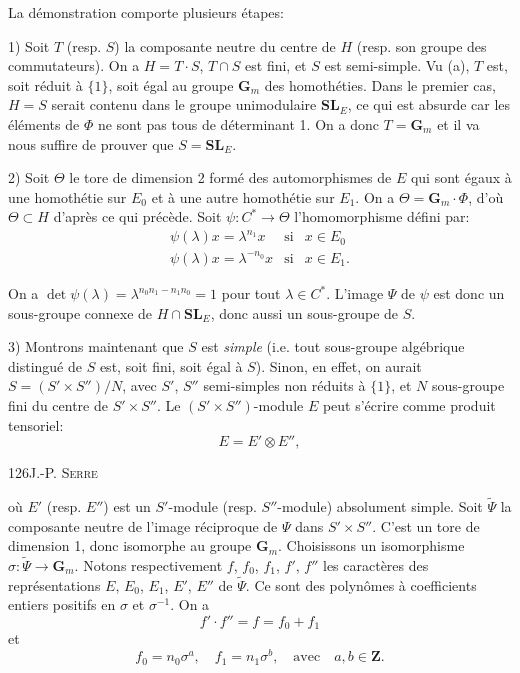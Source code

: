 La démonstration comporte plusieurs étapes:

1) Soit $T$ (resp. $S$) la composante neutre du centre de $H$ (resp. son groupe des commutateurs). On a $H=T\cdot S$, $T\cap S$ est fini, et $S$ est semi-simple. Vu (a), $T$ est, soit réduit à $\{1\}$, soit égal au groupe $\mathbf G_m$ des homothéties. Dans le premier cas, $H=S$ serait contenu dans le groupe unimodulaire $\mathbf{SL}_E$, ce qui est absurde car les éléments de $\Phi$ ne sont pas tous de déterminant 1. On a donc $T=\mathbf G_m$ et il va nous suffire de prouver que $S=\mathbf{SL}_E$.

2) Soit $\Theta$ le tore de dimension 2 formé des automorphismes de $E$ qui sont égaux à une homothétie sur $E_0$ et à une autre homothétie sur $E_1$. On a $\Theta=\mathbf G_m\cdot\Phi$, d'où $\Theta\subset H$ d'après ce qui précède. Soit $\psi:C^*\to\Theta$ l'homomorphisme défini par:
\[
\begin{array}{lll}
\psi(\lambda)x=\lambda^{n_1}x&\text{si}&x\in E_0\\
\psi(\lambda)x=\lambda^{-n_0}x&\text{si}&x\in E_1.
\end{array}
\]

On a $\det\psi(\lambda)=\lambda^{n_0n_1-n_1n_0}=1$ pour tout $\lambda\in C^*$. L'image $\Psi$ de $\psi$ est donc un sous-groupe connexe de $H\cap\mathbf{SL}_E$, donc aussi un sous-groupe de $S$.

3) Montrons maintenant que $S$ est \textit{simple} (i.e. tout sous-groupe algébrique distingué de $S$ est, soit fini, soit égal à $S$). Sinon, en effet, on aurait $S=(S'\times S'')/N$, avec $S'$, $S''$ semi-simples non réduits à $\{1\}$, et $N$ sous-groupe fini du centre de $S'\times S''$. Le $(S'\times S'')$-module $E$ peut s'écrire comme produit tensoriel:
\[
E=E'\otimes E'',
\]

126\hfill J.-P. \textsc{Serre}

 où $E'$ (resp. $E''$) est un $S'$-module (resp. $S''$-module) absolument simple. Soit $\widetilde\Psi$ la composante neutre de l'image réciproque de $\Psi$ dans $S'\times S''$. C'est un tore de dimension 1, donc isomorphe au groupe $\mathbf G_m$. Choisissons un isomorphisme $\sigma:\widetilde\Psi\to\mathbf G_m$. Notons respectivement $f$, $f_0$, $f_1$, $f'$, $f''$ les caractères des représentations $E$, $E_0$, $E_1$, $E'$, $E''$ de $\widetilde\Psi$. Ce sont des polynômes à coefficients entiers positifs en $\sigma$ et $\sigma^{-1}$. On a
\[
f'\cdot f''=f=f_0+f_1
\]
et
\[
f_0=n_0\sigma^a,\quad f_1=n_1\sigma^b,\quad\text{avec}\quad a,b\in\mathbf Z.
\]

